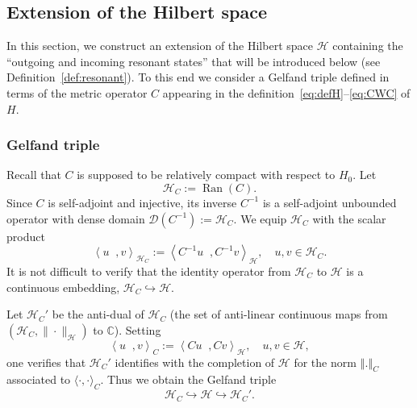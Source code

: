 \documentclass[AHL,Unicode,longabstracts,published]{cedram}
\newcommand{\Hi}{\mathcal{H}}
\newcommand{\bbC}{\mathbb{C}}
\newcommand{\norme}[1]{\left\Vert #1\right\Vert}
\newcommand{\scal}[2]{\left\langle{#1} \middle., {#2}\right\rangle}
\newcommand{\clD}{\mathcal{D}}
\DeclareMathOperator{\Ran}{Ran}
\newcommand*\bbC{\mathbb{C}}
\newcommand{\Hi}{\mathcal{H}}
\begin{document}
\subsection{Extension of the Hilbert space}\label{subsec:extension}



In this section, we construct an extension of the Hilbert space $\Hi$ containing the ``outgoing and incoming resonant states'' that will be introduced below (see Definition~\ref{def:resonant}). To this end we consider a Gelfand triple defined in terms of the metric operator $C$ appearing in the definition~\eqref{eq:defH}--\eqref{eq:CWC} of $H$.

\subsubsection{Gelfand triple}
Recall that $C$ is supposed to be relatively compact with respect to $H_0$. Let
\begin{equation*}
\Hi_C:=\Ran(C).
\end{equation*}
Since $C$ is self-adjoint and injective, its inverse $C^{-1}$ is a self-adjoint unbounded operator with dense domain $\clD(C^{-1}):=\Hi_C$. We equip $\Hi_C$ with the scalar product
\begin{equation*}
\scal{u}{v}_{\Hi_C}:=\scal{C^{-1}u}{C^{-1}v}_\Hi,\quad u,v\in\Hi_C.
\end{equation*}
It is not difficult to verify that the identity operator from $\Hi_C$ to $\Hi$ is a continuous embedding, $\Hi_C\hookrightarrow\Hi$.

Let $\Hi_C'$ be the anti-dual of $\Hi_C$ (the set of anti-linear continuous maps from $(\Hi_C,\|\cdot\|_\Hi)$ to $\bbC$). Setting
\begin{equation*}
\scal{u}{v}_{C}:=\scal{Cu}{Cv}_\Hi, \quad u,v\in\Hi,
\end{equation*}
one verifies that $\Hi_C'$ identifies with the completion of $\Hi$ for the norm $\norme{.}_C$ associated to $\langle\cdot,\cdot\rangle_C$. Thus we obtain the Gelfand triple
\begin{equation*}
\Hi_C\hookrightarrow\Hi\hookrightarrow\Hi_C'.
\end{equation*}
\end{document}
